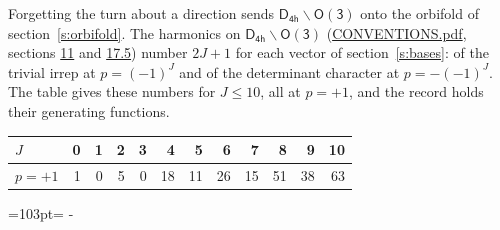 \documentclass[10pt,a4paper]{article}
\newcommand{\needspace}[1]{\par\penalty-100\begingroup\dimen0=#1\relax\dimen2=\pagegoal
  \advance\dimen2-\pagetotal\ifdim\dimen0>\dimen2\relax\ifdim\dimen2>0pt\vfil\break\fi\fi
  \endgroup}
\numberwithin{equation}{section}
\newcommand{\grp}[1]{\mathsf{#1}}
\begin{document}
Forgetting the turn about a direction sends $\grp{D_{4h}}\backslash\grp{O(3)}$ onto the orbifold of section~\ref{s:orbifold}.
The harmonics on $\grp{D_{4h}}\backslash\grp{O(3)}$ (\href{../../CONVENTIONS.pdf}{CONVENTIONS.pdf}, sections \href{../../CONVENTIONS.pdf\#conv.11}{11} and \href{../../CONVENTIONS.pdf\#conv.17.5}{17.5}) number $2J + 1$ for each vector of section~\ref{s:bases}: of the trivial irrep at $p = (-1)^J$ and of the determinant character at $p = -(-1)^J$. The table gives these numbers for $J \le 10$, all at $p = +1$, and the record holds their generating functions.
{\small\setlength{\tabcolsep}{4pt}\begin{longtable}{@{}lrrrrrrrrrrr@{}}\toprule
$J$ & 0 & 1 & 2 & 3 & 4 & 5 & 6 & 7 & 8 & 9 & 10\\\midrule\endhead
\bottomrule\endfoot\endlastfoot
$p = +1$ & 1 & 0 & 5 & 0 & 18 & 11 & 26 & 15 & 51 & 38 & 63\\
\bottomrule\end{longtable}}
\needspace{103pt}
\end{document}
